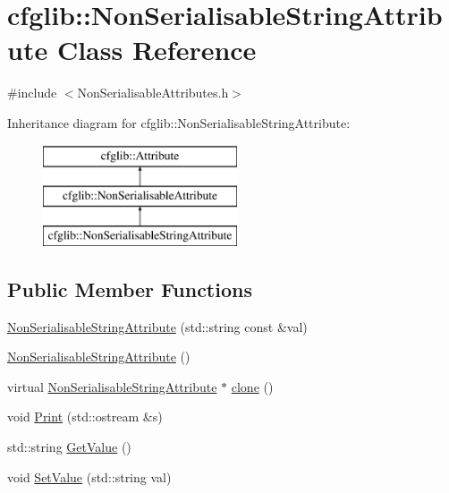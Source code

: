 \hypertarget{classcfglib_1_1NonSerialisableStringAttribute}{}\section{cfglib\+:\+:Non\+Serialisable\+String\+Attribute Class Reference}
\label{classcfglib_1_1NonSerialisableStringAttribute}


{\ttfamily \#include $<$Non\+Serialisable\+Attributes.\+h$>$}

Inheritance diagram for cfglib\+:\+:Non\+Serialisable\+String\+Attribute\+:\begin{figure}[H]
\begin{center}
\leavevmode
\includegraphics[height=3.000000cm]{classcfglib_1_1NonSerialisableStringAttribute}
\end{center}
\end{figure}
\subsection*{Public Member Functions}
\begin{DoxyCompactItemize}
\item 
\hyperlink{classcfglib_1_1NonSerialisableStringAttribute_a7f6f569a83349f8f41d187df56a43b65}{Non\+Serialisable\+String\+Attribute} (std\+::string const \&val)
\item 
\hyperlink{classcfglib_1_1NonSerialisableStringAttribute_a1432b55b0449e2fd8bdb8d6d7232b056}{Non\+Serialisable\+String\+Attribute} ()
\item 
virtual \hyperlink{classcfglib_1_1NonSerialisableStringAttribute}{Non\+Serialisable\+String\+Attribute} $\ast$ \hyperlink{classcfglib_1_1NonSerialisableStringAttribute_a5a7857efb5a59c478ef31266ddfd2f2c}{clone} ()
\item 
void \hyperlink{classcfglib_1_1NonSerialisableStringAttribute_aedeb7ccd57b84ed2e3bcfc464038682e}{Print} (std\+::ostream \&s)
\item 
std\+::string \hyperlink{classcfglib_1_1NonSerialisableStringAttribute_a3fb5338650a4569eb9b22b5419c9b6b5}{Get\+Value} ()
\item 
void \hyperlink{classcfglib_1_1NonSerialisableStringAttribute_a708afb5de2e1139c2119589c3e8bd434}{Set\+Value} (std\+::string val)
\end{DoxyCompactItemize}
